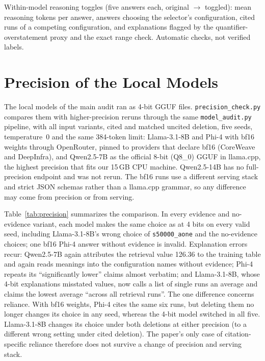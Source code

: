 \begin{table}[h]
\centering\footnotesize\setlength{\tabcolsep}{3pt}
\caption{Within-model reasoning toggles (five answers each, original $\to$ toggled): mean reasoning tokens per answer, answers choosing the selector's configuration, cited runs of a competing configuration, and explanations flagged by the quantifier-overstatement proxy and the exact range check. Automatic checks, not verified labels.}
\label{tab:reasoning}
\begin{adjustbox}{max width=\columnwidth}

\end{adjustbox}
\end{table}

\section{Precision of the Local Models}
\label{app:precision}
The local models of the main audit ran as 4-bit GGUF files. \texttt{precision\_check.py} compares them with higher-precision reruns through the same \texttt{model\_audit.py} pipeline, with all input variants, cited and matched uncited deletion, five seeds, temperature~0 and the same 384-token limit: Llama-3.1-8B and Phi-4 with bf16 weights through OpenRouter, pinned to providers that declare bf16 (CoreWeave and DeepInfra), and Qwen2.5-7B as the official 8-bit (Q8\_0) GGUF in llama.cpp, the highest precision that fits our 15\,GB CPU machine. Qwen2.5-14B has no full-precision endpoint and was not rerun. The bf16 runs use a different serving stack and strict JSON schemas rather than a llama.cpp grammar, so any difference may come from precision or from serving.

Table~\ref{tab:precision} summarizes the comparison. In every evidence and no-evidence variant, each model makes the same choice as at 4 bits on every valid seed, including Llama-3.1-8B's wrong choice of \texttt{s50000\_aone} and the no-evidence choices; one bf16 Phi-4 answer without evidence is invalid. Explanation errors recur: Qwen2.5-7B again attributes the retrieval value 126.36 to the training table and again reads meanings into the configuration names without evidence; Phi-4 repeats its ``significantly lower'' claims almost verbatim; and Llama-3.1-8B, whose 4-bit explanations misstated values, now calls a list of single runs an average and claims the lowest average ``across all retrieval runs''. The one difference concerns reliance. With bf16 weights, Phi-4 cites the same six runs, but deleting them no longer changes its choice in any seed, whereas the 4-bit model switched in all five. Llama-3.1-8B changes its choice under both deletions at either precision (to a different wrong setting under cited deletion). The paper's only case of citation-specific reliance therefore does not survive a change of precision and serving stack.

